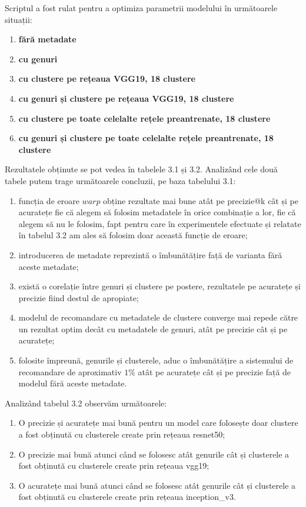 Scriptul a fost rulat pentru a optimiza parametrii modelului în următoarele situații:
\begin{enumerate}
	\item \textbf{fără metadate}
	\item \textbf{cu genuri}
	\item \textbf{cu clustere pe rețeaua VGG19, 18 clustere}
	\item \textbf{cu genuri și clustere pe rețeaua VGG19, 18 clustere}
	\item \textbf{cu clustere pe toate celelalte rețele preantrenate, 18 clustere}
	\item \textbf{cu genuri și clustere pe toate celelalte rețele preantrenate, 18 clustere}
\end{enumerate}
Rezultatele obținute se pot vedea în tabelele 3.1 și 3.2. Analizând cele două tabele putem trage următoarele concluzii, pe baza tabelului 3.1:
\begin{enumerate}
	\item funcția de eroare $warp$ obține rezultate mai bune atât pe precizie@k cât și pe acuratețe fie că alegem să folosim metadatele în orice combinație a lor, fie că alegem să nu le folosim, fapt pentru care în experimentele efectuate și relatate în tabelul 3.2 am ales să folosim doar această funcție de eroare;
	\item introducerea de metadate reprezintă o îmbunătățire față de varianta fără aceste metadate;
	\item există o corelație între genuri și clustere pe postere, rezultatele pe acuratețe și precizie fiind destul de apropiate;
	\item modelul de recomandare cu metadatele de clustere converge mai repede către un rezultat optim decât cu metadatele de genuri, atât pe precizie cât și pe acuratețe;
	\item folosite împreună, genurile și clusterele, aduc o îmbunătățire a sistemului de recomandare de aproximativ $1\%$ atât pe acuratețe cât și pe precizie față de modelul fără aceste metadate.
\end{enumerate}

Analizând tabelul 3.2 observăm următoarele:
\begin{enumerate}
	\item O precizie și acuratețe mai bună pentru un model care folosește doar clustere a fost obținută cu clusterele create prin rețeaua resnet50;
	\item O precizie mai bună atunci când se folosesc atât genurile cât și clusterele a fost obținută cu clusterele create prin rețeaua vgg19;
	\item O acuratețe mai bună atunci când se folosesc atât genurile cât și clusterele a fost obținută cu clusterele create prin rețeaua inception\_v3.
\end{enumerate}

